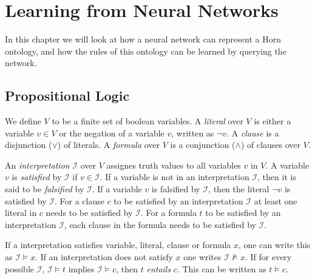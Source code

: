 \chapter{Learning from Neural Networks}

In this chapter we will look at how a neural network can represent a Horn ontology, and how the rules of this ontology can be learned by querying the network.

\section{Propositional Logic}
We define $V$ to be a finite set of boolean variables. A \emph{literal} over $V$ is either a variable $v \in V$ or the negation of a variable $v$, written as $\neg v$. A \emph{clause} is a disjunction ($\vee$) of literals. A \emph{formula} over $V$ is a conjunction ($\wedge$) of clauses over $V$.

An \emph{interpretation} $\mathcal{I}$ over $V$ assignes truth values to all variables $v$ in $V$. A variable $v$ is \emph{satisfied} by $\mathcal{I}$ if $v \in \mathcal{I}$. If a variable is not in an interpretation $\mathcal{I}$, then it is said to be \emph{falsified} by $\mathcal{I}$. If a variable $v$ is falsified by $\mathcal{I}$, then the literal $\neg v$ is satisfied by $\mathcal{I}$. For a clause $c$ to be satisfied by an interpretation $\mathcal{I}$ at least one literal in $c$ needs to be satisfied by $\mathcal{I}$. For a formula $t$ to be satisfied by an interpretation $\mathcal{I}$, each clause in the formula needs to be satisfied by $\mathcal{I}$.

If a interpretation satisfies variable, literal, clause or formula $x$, one can write this as $\mathcal{I} \models x$. If an interpretation does not satisfy $x$ one writes $\mathcal{I} \not \models x $. If for every possible $\mathcal{I}$, $\mathcal{I} \models t$ implies $\mathcal{I} \models c$, then $t$ \emph{entails} $c$. This can be written as $t \models c$.


